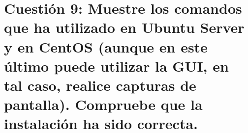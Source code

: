 


\section{Cuestión 9: Muestre los comandos que ha utilizado en Ubuntu Server y en CentOS (aunque en este último puede utilizar la GUI, en tal caso, realice capturas de pantalla). Compruebe que la instalación ha sido correcta.}

